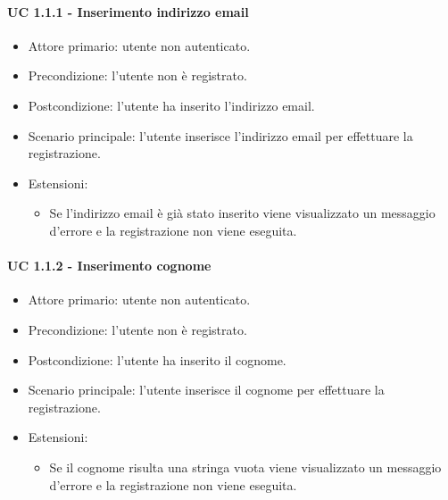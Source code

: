         \paragraph{UC 1.1.1 - Inserimento indirizzo email}
            \begin{itemize}
                \item Attore primario: utente non autenticato.
                \item Precondizione: l'utente non è registrato.
                \item Postcondizione: l'utente ha inserito l'indirizzo email.
                \item Scenario principale: l'utente inserisce l'indirizzo email per effettuare la registrazione.
                \item Estensioni:
                    \begin{itemize}
                        \item Se l'indirizzo email è già stato inserito viene visualizzato un messaggio d'errore e la registrazione non viene eseguita.
                    \end{itemize}
            \end{itemize}
        \paragraph{UC 1.1.2 - Inserimento cognome}
            \begin{itemize}
                \item Attore primario: utente non autenticato.
                \item Precondizione: l'utente non è registrato.
                \item Postcondizione: l'utente ha inserito il cognome.
                \item Scenario principale: l'utente inserisce il cognome per effettuare la registrazione.
                \item Estensioni:
                    \begin{itemize}
                        \item Se il cognome risulta una stringa vuota viene visualizzato un messaggio d'errore e la registrazione non viene eseguita.
                    \end{itemize}
            \end{itemize}
